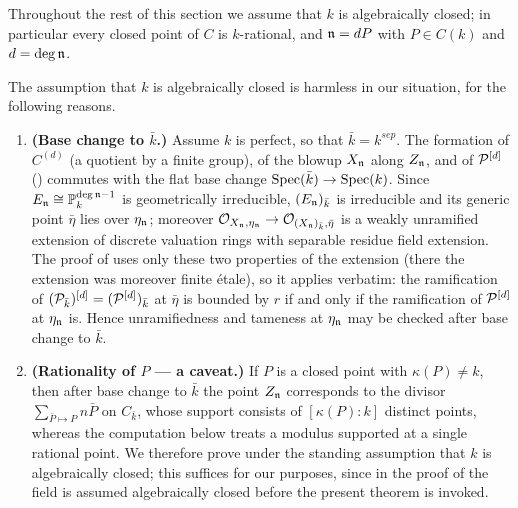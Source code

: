 Throughout the rest of this section we assume that $k$ is algebraically closed; in particular every closed point of $C$ is $k$-rational, and $\mathfrak{n} = dP$ with $P \in C(k)$ and $d = \deg \mathfrak{n}$.

\begin{remnum}\label{rem:algebraically_closed_harmless}
    The assumption that $k$ is algebraically closed is harmless in our situation, for the following reasons.
    \begin{enumerate}
        \item \textbf{(Base change to $\bar{k}$.)} Assume $k$ is perfect, so that $\bar{k}=k^{sep}$.
        The formation of $C^{(d)}$ (a quotient by a finite group), of the blowup $X_{\mathfrak{n}}$ along $Z_{\mathfrak{n}}$, and of
        $\mathcal{P}^{[d]}$ () commutes with the flat base change $\operatorname{Spec}(\bar{k}) \to \operatorname{Spec}(k)$.
        Since $E_{\mathfrak{n}} \cong \mathbb{P}^{\deg \mathfrak{n} - 1}_k$ is geometrically irreducible, $(E_{\mathfrak{n}})_{\bar{k}}$ is irreducible
        and its generic point $\bar{\eta}$ lies over $\eta_{\mathfrak{n}}$; moreover
        $\mathcal{O}_{X_{\mathfrak{n}}, \eta_{\mathfrak{n}}} \to \mathcal{O}_{(X_{\mathfrak{n}})_{\bar{k}}, \bar{\eta}}$ is a weakly unramified extension of discrete
        valuation rings with separable residue field extension. The proof of 
        uses only these two properties of the extension (there the extension was moreover finite étale), so it applies
        verbatim: the ramification of $(\mathcal{P}_{\bar{k}})^{[d]} = (\mathcal{P}^{[d]})_{\bar{k}}$ at $\bar{\eta}$ is bounded by $r$ if
        and only if the ramification of $\mathcal{P}^{[d]}$ at $\eta_{\mathfrak{n}}$ is. Hence unramifiedness and tameness at $\eta_{\mathfrak{n}}$
        may be checked after base change to $\bar{k}$.
        \item \textbf{(Rationality of $P$ --- a caveat.)} If $P$ is a closed point with $\kappa(P) \neq k$, then after base
        change to $\bar{k}$ the point $Z_{\mathfrak{n}}$ corresponds to the divisor $\sum_{\bar{P} \mapsto P} n \bar{P}$ on
        $C_{\bar{k}}$, whose support consists of $[\kappa(P):k]$ distinct points, whereas the computation below treats a
        modulus supported at a single rational point. We therefore prove  under
        the standing assumption that $k$ is algebraically closed; this suffices for our purposes, since in the proof of
         the field is assumed algebraically closed before the present
        theorem is invoked.
    \end{enumerate}
\end{remnum}

